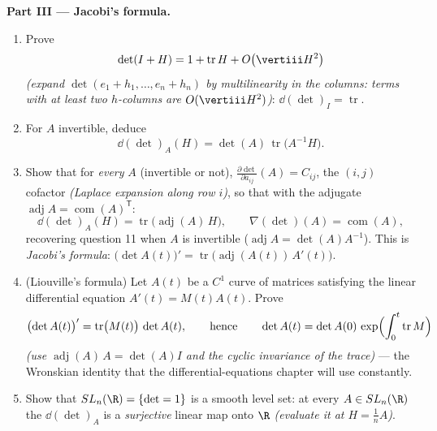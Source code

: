 \begin{problem}
\medskip
\noindent\textbf{Part III --- Jacobi's formula.}
\begin{enumerate}[resume]
  \item Prove
        \[
        \det(I + H) = 1 + \operatorname{tr}H +
        O\bigl(\vertiii H^2\bigr)
        \]
        \emph{(expand $\det(e_1 + h_1, \dots, e_n + h_n)$ by
        multilinearity in the columns: terms with at least two
        $h$-columns are $O(\vertiii H^2)$)}: $\dd(\det)_I =
        \operatorname{tr}$.
  \item For $A$ invertible, deduce
        \[
        \dd(\det)_A(H) = \det(A)\,
        \operatorname{tr}\bigl(A^{-1}H\bigr) .
        \]
  \item Show that for \emph{every} $A$ (invertible or not),
        $\frac{\partial\det}{\partial a_{ij}}(A) = C_{ij}$, the
        $(i,j)$ cofactor \emph{(Laplace expansion along row
        $i$)}, so that with the adjugate $\operatorname{adj}A =
        \operatorname{com}(A)^{\mathsf T}$:
        \[
        \dd(\det)_A(H) =
        \operatorname{tr}\bigl(\operatorname{adj}(A)\,H\bigr),
        \qquad
        \nabla(\det)(A) = \operatorname{com}(A) ,
        \]
        recovering question 11 when $A$ is invertible
        ($\operatorname{adj}A = \det(A)A^{-1}$). This is
        \emph{Jacobi's formula}: $\bigl(\det
        A(t)\bigr)' = \operatorname{tr}\bigl(
        \operatorname{adj}(A(t))\,A'(t)\bigr)$.
  \item (Liouville's formula) Let $A(t)$ be a $C^1$ curve of
        matrices satisfying the linear differential equation
        $A'(t) = M(t)A(t)$. Prove
        \[
        \bigl(\det A(t)\bigr)' =
        \operatorname{tr}\bigl(M(t)\bigr)\,\det A(t),
        \qquad\text{hence}\qquad
        \det A(t) = \det A(0)\,
        \exp\Bigl(\int_0^t\operatorname{tr}M\Bigr)
        \]
        \emph{(use $\operatorname{adj}(A)\,A = \det(A)I$ and
        the cyclic invariance of the trace)} --- the Wronskian
        identity that the differential-equations chapter will
        use constantly.
  \item Show that $SL_n(\R) = \{\det = 1\}$ is a smooth level
        set: at every $A \in SL_n(\R)$ the 
        $\dd(\det)_A$ is a \emph{surjective} linear map onto
        $\R$ \emph{(evaluate it at $H = \frac1nA$)}.
\end{enumerate}


\end{problem}
